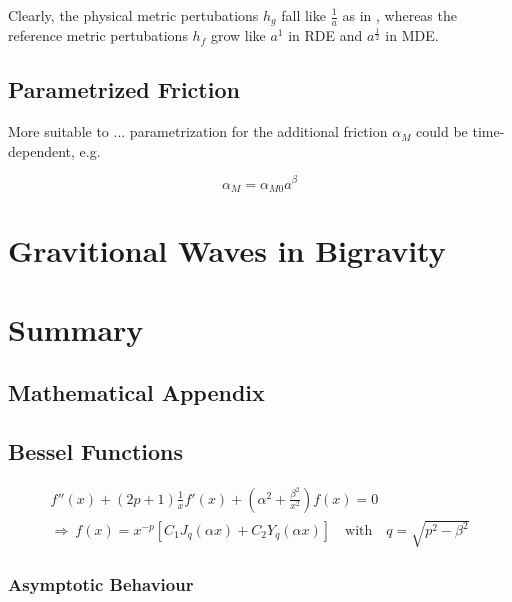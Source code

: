 \documentclass{scrreprt}
\begin{document}
Clearly, the physical metric pertubations $h_g$ fall like $\frac{1}{a}$ as in \LambdaCDM, whereas the reference metric pertubations $h_f$ grow like $a^1$ in RDE and $a^\frac{1}{2}$ in MDE.


\section{Parametrized Friction}

More suitable to ... parametrization for the additional friction $\alpha_M$ could be time-dependent, e.g.

\begin{equation}
	\alpha_M = \alpha_{M0} a^\beta
\end{equation}



\chapter{Gravitional Waves in Bigravity}

\chapter{Summary}


\begin{appendices}

\chapter{Mathematical Appendix}

\section{Bessel Functions}

\begin{align}
	f''(x) + \left(2p+1\right)\frac{1}{x} f'(x) + \left(\alpha^2 + \frac{\beta^2}{x^2}\right) f(x) = 0 \\
	\Rightarrow \: f(x) = x^{-p} \left[C_1 J_q(\alpha x) + C_2 Y_q(\alpha x)\right] \quad \textrm{with} \quad q = \sqrt{p^2 - \beta^2}
\end{align}

\subsection{Asymptotic Behaviour}

\end{appendices}



\end{document}
